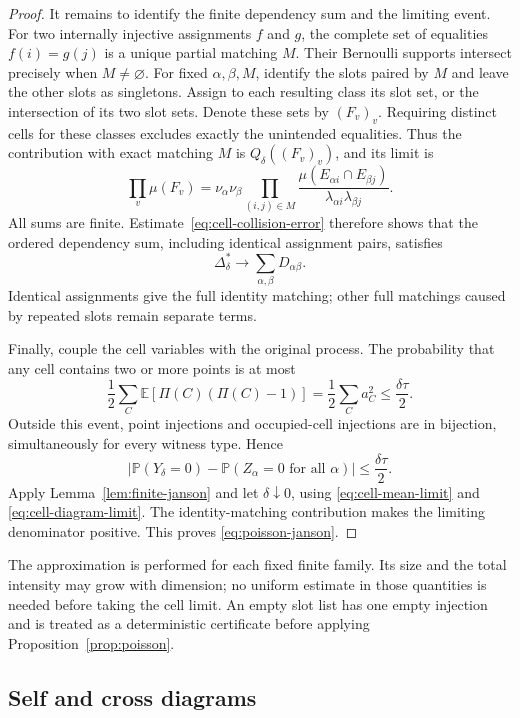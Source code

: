 \begin{proof}
It remains to identify the finite dependency sum and the limiting event.
For two internally injective assignments $f$ and $g$, the complete set
of equalities $f(i)=g(j)$ is a unique partial matching $M$.
Their Bernoulli supports intersect precisely when $M\ne\varnothing$.
For fixed $\alpha,\beta,M$, identify the slots paired by $M$ and
leave the other slots as singletons. Assign to each resulting class its
slot set, or the intersection of its two slot sets. Denote these sets
by $(F_v)_v$. Requiring distinct cells for these classes excludes
exactly the unintended equalities. Thus the contribution with exact
matching $M$ is $Q_\delta((F_v)_v)$, and its limit is
\[
 \prod_v\mu(F_v)=\nu_\alpha\nu_\beta
 \prod_{(i,j)\in M}
 \frac{\mu(E_{\alpha i}\cap E_{\beta j})}
      {\lambda_{\alpha i}\lambda_{\beta j}}.
\]
All sums are finite. Estimate~\eqref{eq:cell-collision-error} therefore
shows that the ordered dependency sum, including identical assignment
pairs, satisfies
\begin{equation}
 \Delta^*_\delta\longrightarrow\sum_{\alpha,\beta}D_{\alpha\beta}.
 \label{eq:cell-diagram-limit}
\end{equation}
Identical assignments give the full identity matching; other full
matchings caused by repeated slots remain separate terms.

Finally, couple the cell variables with the original process. The
probability that any cell contains two or more points is at most
\[
 \frac12\sum_C\mathbb{E}[\Pi(C)(\Pi(C)-1)]
 =\frac12\sum_Ca_C^2\le\frac{\delta\tau}{2}.
\]
Outside this event, point injections and occupied-cell injections are
in bijection, simultaneously for every witness type. Hence
\[
 \left|\mathbb{P}(Y_\delta=0)-
       \mathbb{P}(Z_\alpha=0\text{ for all }\alpha)\right|
 \le\frac{\delta\tau}{2}.
\]
Apply Lemma~\ref{lem:finite-janson} and let $\delta\downarrow0$,
using \eqref{eq:cell-mean-limit} and \eqref{eq:cell-diagram-limit}.
The identity-matching contribution makes the limiting denominator
positive. This proves \eqref{eq:poisson-janson}.
\end{proof}

The approximation is performed for each fixed finite family. Its size
and the total intensity may grow with dimension; no uniform estimate
in those quantities is needed before taking the cell limit. An empty
slot list has one empty injection and is treated as a deterministic
certificate before applying Proposition~\ref{prop:poisson}.

\subsection{Self and cross diagrams}

